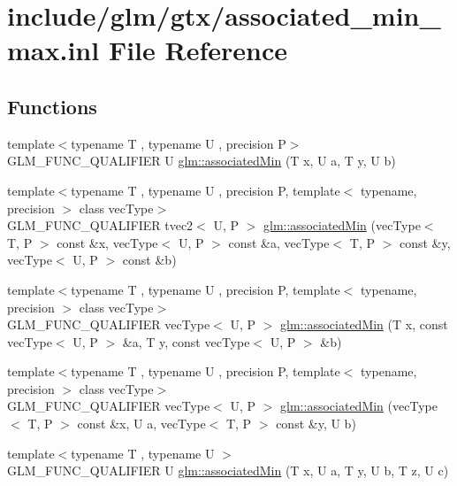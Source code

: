 \hypertarget{associated__min__max_8inl}{}\section{include/glm/gtx/associated\+\_\+min\+\_\+max.inl File Reference}
\label{associated__min__max_8inl}
\subsection*{Functions}
\begin{DoxyCompactItemize}
\item 
{\footnotesize template$<$typename T , typename U , precision P$>$ }\\G\+L\+M\+\_\+\+F\+U\+N\+C\+\_\+\+Q\+U\+A\+L\+I\+F\+I\+ER U \hyperlink{group__gtx__associated__min__max_gacc01bd272359572fc28437ae214a02df}{glm\+::associated\+Min} (T x, U a, T y, U b)
\item 
{\footnotesize template$<$typename T , typename U , precision P, template$<$ typename, precision $>$ class vec\+Type$>$ }\\G\+L\+M\+\_\+\+F\+U\+N\+C\+\_\+\+Q\+U\+A\+L\+I\+F\+I\+ER tvec2$<$ U, P $>$ \hyperlink{group__gtx__associated__min__max_ga8b538d10872626668a078e2bd495af25}{glm\+::associated\+Min} (vec\+Type$<$ T, P $>$ const \&x, vec\+Type$<$ U, P $>$ const \&a, vec\+Type$<$ T, P $>$ const \&y, vec\+Type$<$ U, P $>$ const \&b)
\item 
{\footnotesize template$<$typename T , typename U , precision P, template$<$ typename, precision $>$ class vec\+Type$>$ }\\G\+L\+M\+\_\+\+F\+U\+N\+C\+\_\+\+Q\+U\+A\+L\+I\+F\+I\+ER vec\+Type$<$ U, P $>$ \hyperlink{group__gtx__associated__min__max_ga1dccff48fa5650c746533de83467da6e}{glm\+::associated\+Min} (T x, const vec\+Type$<$ U, P $>$ \&a, T y, const vec\+Type$<$ U, P $>$ \&b)
\item 
{\footnotesize template$<$typename T , typename U , precision P, template$<$ typename, precision $>$ class vec\+Type$>$ }\\G\+L\+M\+\_\+\+F\+U\+N\+C\+\_\+\+Q\+U\+A\+L\+I\+F\+I\+ER vec\+Type$<$ U, P $>$ \hyperlink{group__gtx__associated__min__max_ga076717f4e07c6ae725cc1382d1ac4869}{glm\+::associated\+Min} (vec\+Type$<$ T, P $>$ const \&x, U a, vec\+Type$<$ T, P $>$ const \&y, U b)
\item 
{\footnotesize template$<$typename T , typename U $>$ }\\G\+L\+M\+\_\+\+F\+U\+N\+C\+\_\+\+Q\+U\+A\+L\+I\+F\+I\+ER U \hyperlink{group__gtx__associated__min__max_gad0aa8f86259a26d839d34a3577a923fc}{glm\+::associated\+Min} (T x, U a, T y, U b, T z, U c)

\end{DoxyCompactItemize}
